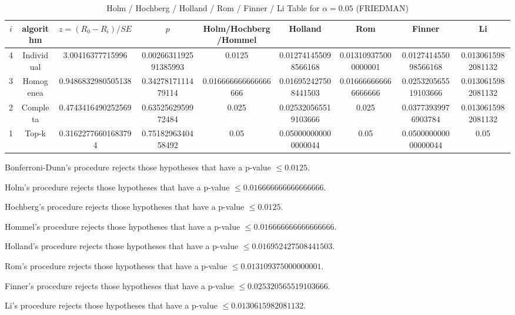 \documentclass[a4paper,10pt]{article}
\begin{document}
\begin{landscape}
\begin{table}[!htp]
\centering\scriptsize
\caption{Holm / Hochberg / Holland / Rom / Finner / Li Table for $\alpha=0.05$ (FRIEDMAN)}
\begin{tabular}{ccccccccc}
$i$&algorithm&$z=(R_0 - R_i)/SE$&$p$&Holm/Hochberg/Hommel&Holland&Rom&Finner&Li\\
\hline
4&Individual&3.00416377715996&0.0026631192591385993&0.0125&0.012741455098566168&0.013109375000000001&0.012741455098566168&0.0130615982081132\\
3&Homogenea&0.9486832980505138&0.3427817111479114&0.016666666666666666&0.016952427508441503&0.016666666666666666&0.025320565519103666&0.0130615982081132\\
2&Completa&0.4743416490252569&0.6352562959972484&0.025&0.025320565519103666&0.025&0.03773939976903784&0.0130615982081132\\
1&Top-k&0.31622776601683794&0.7518296340458492&0.05&0.050000000000000044&0.05&0.050000000000000044&0.05\\
\hline
\end{tabular}
\end{table}
Bonferroni-Dunn's procedure rejects those hypotheses that have a p-value $\le0.0125$.


Holm's procedure rejects those hypotheses that have a p-value $\le0.016666666666666666$.


Hochberg's procedure rejects those hypotheses that have a p-value $\le0.0125$.


Hommel's procedure rejects those hypotheses that have a p-value $\le0.016666666666666666$.


Holland's procedure rejects those hypotheses that have a p-value $\le0.016952427508441503$.


Rom's procedure rejects those hypotheses that have a p-value $\le0.013109375000000001$.


Finner's procedure rejects those hypotheses that have a p-value $\le0.025320565519103666$.


Li's procedure rejects those hypotheses that have a p-value $\le0.0130615982081132$.



\newpage


\end{landscape}
\end{document}

